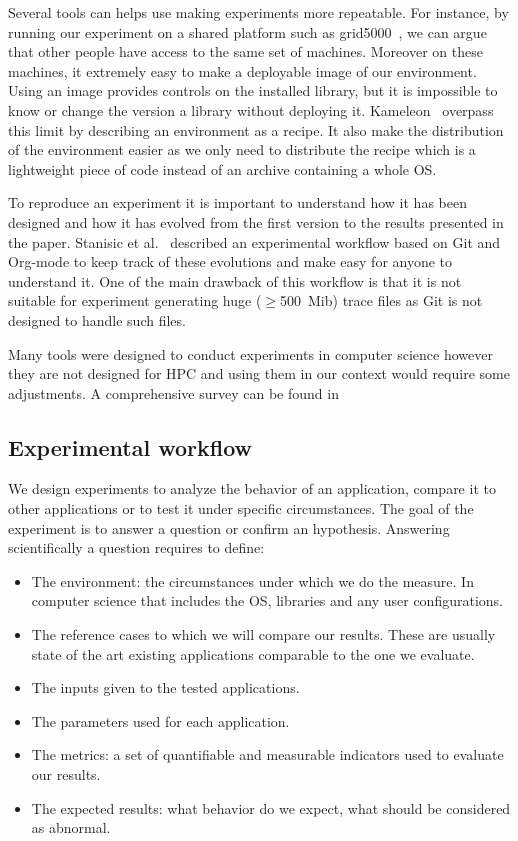Several tools can helps use making experiments more repeatable.
For instance, by running our experiment on a shared platform such as grid5000~\cite{Cappello05Grid5000}, we can argue that other people have access to the same set of machines.
Moreover on these machines, it extremely easy to make a deployable image of our environment.
Using an image provides controls on the installed library, but it is impossible to know or change the version a library without deploying it.
\gls{Kameleon}~\cite{Ruiz15Reconstructable} overpass this limit by describing an environment as a recipe.
It also make the distribution of the environment easier as we only need to distribute the recipe which is a lightweight piece of code instead of an archive containing a whole \gls{OS}.

To reproduce an experiment it is important to understand how it has been designed and how it has evolved from the first version to the results presented in the paper.
Stanisic et al.~\cite[Chapter~4, p31-44]{Stanisic15Reproducible} described an experimental workflow based on \gls{Git} and \gls{Org-mode} to keep track of these evolutions and make easy for anyone to understand it.
One of the main drawback of this workflow is that it is not suitable for experiment generating huge ($\ge$\SI{500}{Mib}) trace files as \gls{Git} is not designed to handle such files.

Many tools were designed to conduct experiments in computer science however they are not designed for \gls{HPC} and using them in our context would require some adjustments.
A comprehensive survey can be found in~\cite[Chapter~3, p17-19]{Stanisic15Reproducible}

\subsection{Experimental workflow}

We design experiments to analyze the behavior of an application, compare it to other applications or to test it under specific circumstances.
The goal of the experiment is to answer a question or confirm an hypothesis.
Answering scientifically a question requires to define:
\begin{itemize}
    \item The environment: the circumstances under which we do the measure.
    In computer science that includes the \gls{OS}, libraries and any user configurations.
    \item The reference cases to which we will compare our results.
        These are usually state of the art existing applications comparable to the one we evaluate.
    \item The inputs given to the tested applications.
    \item The parameters used for each application.
    \item The metrics: a set of quantifiable and measurable indicators used to evaluate our results.
    \item The expected results: what behavior do we expect, what should be considered as abnormal.
\end{itemize}

